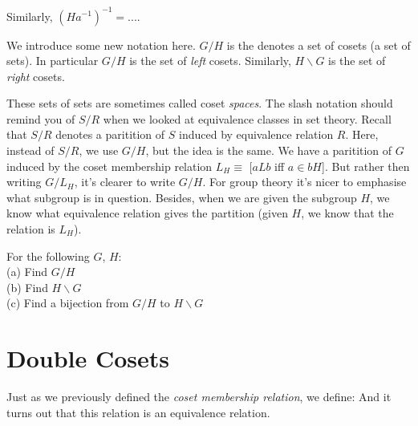 Similarly, $(Ha^{-1})^{-1} = ....$




We introduce some new notation here. 
$G/H$ is the denotes a set of cosets (a set of sets). 
In particular $G/H$ is the set of \textit{left} cosets. 
Similarly, $H\backslash G$ is the set of \textit{right} cosets. 

These sets of sets are sometimes called coset \textit{spaces}. 
The slash notation should remind you of $S/R$ when we looked at equivalence 
classes in set theory. Recall that $S/R$ denotes a paritition of $S$
induced by equivalence relation $R$. Here, instead of $S/R$, 
we use $G/H$, but the idea is the same. We have a paritition of $G$ 
induced by the coset membership relation $L_H \equiv$ [$a L b$ iff $a \in bH$]. 
But rather then writing $G/L_H$, it's clearer to write $G/H$. 
For group theory it's nicer to emphasise what subgroup is in question.
Besides, when we are given the subgroup $H$, 
we know what equivalence relation gives the partition (given $H$, 
we know that the relation is $L_H$). 

\frmrule

\begin{example}
For the following $G$, $H$:\\
(a) Find $G/H$ \\
(b) Find $H\backslash G$ \\
(c) Find a bijection from $G/H$ to $H\backslash G$
\end{example}

\frmrule


\section{Double Cosets}




Just as we previously defined the \textit{coset membership relation}, we define:
And it turns out that this relation is an equivalence relation.



